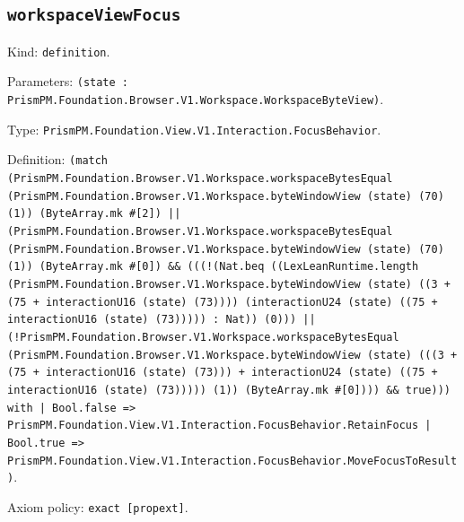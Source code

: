 \documentclass[11pt]{article}
\begin{document}
\subsection*{\texttt{workspaceViewFocus}}
\noindent Kind: \texttt{definition}.\par
\noindent Parameters: \texttt{(state : PrismPM.Foundation.Browser.V1.Workspace.WorkspaceByteView)}.\par
\noindent Type: \texttt{PrismPM.Foundation.View.V1.Interaction.FocusBehavior}.\par
\noindent Definition: \texttt{(match (PrismPM.Foundation.Browser.V1.Workspace.workspaceBytesEqual (PrismPM.Foundation.Browser.V1.Workspace.byteWindowView (state) (70) (1)) (ByteArray.mk \#[2]) || (PrismPM.Foundation.Browser.V1.Workspace.workspaceBytesEqual (PrismPM.Foundation.Browser.V1.Workspace.byteWindowView (state) (70) (1)) (ByteArray.mk \#[0]) \&\& (((!(Nat.beq ((LexLeanRuntime.length (PrismPM.Foundation.Browser.V1.Workspace.byteWindowView (state) ((3 + (75 + interactionU16 (state) (73)))) (interactionU24 (state) ((75 + interactionU16 (state) (73))))) : Nat)) (0))) || (!PrismPM.Foundation.Browser.V1.Workspace.workspaceBytesEqual (PrismPM.Foundation.Browser.V1.Workspace.byteWindowView (state) (((3 + (75 + interactionU16 (state) (73))) + interactionU24 (state) ((75 + interactionU16 (state) (73))))) (1)) (ByteArray.mk \#[0]))) \&\& true))) with | Bool.false => PrismPM.Foundation.View.V1.Interaction.FocusBehavior.RetainFocus | Bool.true => PrismPM.Foundation.View.V1.Interaction.FocusBehavior.MoveFocusToResult)}.\par
\noindent Axiom policy: \texttt{exact [propext]}.\par
\end{document}
